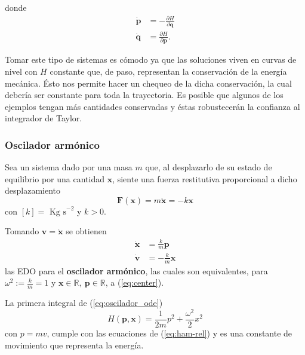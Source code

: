 donde
\begin{align}
 \dot{\mathbf{p}} &= -\frac{\partial{H}}{\partial{\mathbf{q}}} \nonumber \\
 \dot{\mathbf{q}} &= \frac{\partial{H}}{\partial{\mathbf{p}}}.
\label{eq:ham-rel}
\end{align}

Tomar este tipo de sistemas es cómodo ya que las soluciones viven en curvas de nivel con $H$ constante que, de paso, representan la conservación de la energía mecánica. Ésto nos permite hacer un chequeo de la dicha conservación, la cual debería ser constante para toda la trayectoria. Es posible que algunos de los ejemplos tengan más cantidades conservadas y éstas robustecerán la confianza al integrador de Taylor.

\subsubsection{Oscilador armónico}
\label{sec:oscilador}
Sea un sistema dado por una masa $m$ que, al desplazarlo de su estado de equilibrio por una cantidad $\mathbf{x}$, siente una fuerza restitutiva proporcional a dicho desplazamiento
\begin{equation}
 \mathbf{F}(\mathbf{x}) = m \ddot{\mathbf{x}} = - k\mathbf{x}
 \label{eq:oscilador_force}
\end{equation}
con $[k] = \textrm{ Kg s}^{-2}$  y $k>0$. 

Tomando $\mathbf{v} = \dot{\mathbf{x}}$ se obtienen
\begin{align}
 \dot{\mathbf{x}} &= \frac{k}{m} \mathbf{p} \nonumber \\
 \dot{\mathbf{v}} &= - \frac{k}{m} \mathbf{x}
 \label{eq:oscilador_ode}
\end{align}
las EDO para el \textbf{oscilador armónico}, las cuales son equivalentes, para $\omega^2 := \frac{k}{m} = 1$ y $\mathbf{x} \in \mathbb{R},\ \mathbf{p} \in \mathbb{R}$, a (\ref{eq:center}). 

La primera integral de (\ref{eq:oscilador_ode})
\begin{equation}
 H(\mathbf{p},\mathbf{x}) = \frac{1}{2m}p^2 + \frac{\omega^2}{2} x^2
 \label{eq:oscilador_ham}
\end{equation}
con $p=mv$, cumple con las ecuaciones de (\ref{eq:ham-rel}) y es una constante de movimiento que representa la energía.

